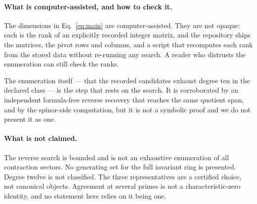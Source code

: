 \paragraph*{What is computer-assisted, and how to check it.}
The dimensions in Eq.~\eqref{eq:main} are computer-assisted. They are not opaque:
each is the rank of an explicitly recorded integer matrix, and the repository
ships the matrices, the pivot rows and columns, and a script that recomputes each
rank from the stored data without re-running any search. A reader who distrusts
the enumeration can still check the ranks.

The enumeration itself --- that the recorded candidates exhaust degree ten in the
declared class --- is the step that rests on the search. It is corroborated by an
independent formula-free reverse recovery that reaches the same quotient span,
and by the spinor-side computation, but it is not a symbolic proof and we do not
present it as one.

\paragraph*{What is not claimed.}
The reverse search is bounded and is not an exhaustive enumeration of all
contraction sectors. No generating set for the full invariant ring is presented.
Degree twelve is not classified. The three representatives are a certified choice,
not canonical objects. Agreement at several primes is not a characteristic-zero
identity, and no statement here relies on it being one.
